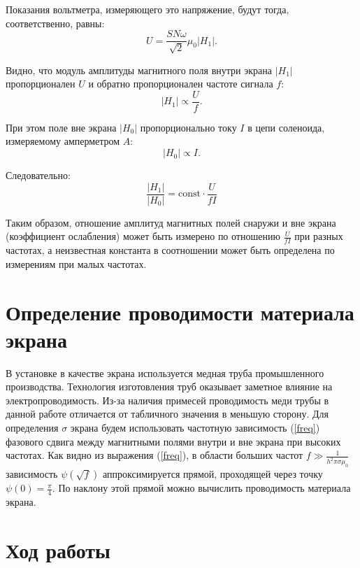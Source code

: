 	Показания вольтметра, измеряющего это напряжение, будут тогда, соответственно, равны:
	\begin{equation*}
		U = \frac{SN\omega}{\sqrt{2}}\mu_0 |H_1|.
	\end{equation*}

	Видно, что модуль амплитуды магнитного поля внутри экрана $|H_1|$ пропорционален $U$ и обратно пропорционален частоте сигнала $f$:
	\begin{equation*}
		|H_1| \propto \frac{U}{f}.
	\end{equation*}

	При этом поле вне экрана $|H_0|$ пропорционально току $I$ в цепи соленоида, измеряемому амперметром $A$:
	\begin{equation*}
		|H_0| \propto I.
	\end{equation*} 

	Следовательно:
	\begin{equation}
		\frac{|H_1|}{|H_0|} = \text{const} \cdot \frac{U}{fI}
	\end{equation}

	Таким образом, отношение амплитуд магнитных полей снаружи и
	вне экрана (коэффициент ослабления) может быть измерено по отношению $\frac{U}{fI}$ при разных частотах, а неизвестная константа в соотношении может быть определена по измерениям при малых частотах.
	
	\vspace{90mm}
	\section*{Определение проводимости материала экрана}
	В установке в качестве экрана используется медная труба промышленного производства. Технология изготовления труб оказывает заметное влияние на электропроводимость. Из-за наличия примесей проводимость меди трубы в данной работе отличается от табличного значения в меньшую сторону. Для определения $\sigma$ экрана будем использовать частотную зависимость (\ref{freq}) фазового сдвига между магнитными полями внутри и вне экрана при высоких частотах. Как видно из выражения (\ref{freq}), в области больших частот $f \gg \frac{1}{h^2 \pi \sigma\mu_0}$ зависимость $\psi(\sqrt{f})$ аппроксимируется прямой, проходящей через точку $\psi(0) = \frac{\pi}{4}$. По наклону этой прямой можно вычислить проводимость материала экрана.
	
	
	
	\newpage
    \section*{Ход работы}

